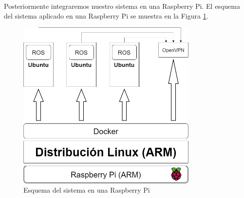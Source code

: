 Posteriormente integraremos nuestro sistema en una Raspberry Pi. El esquema del sistema aplicado en una Raspberry Pi se muestra en la Figura \ref{fig:esquemaRPi}.
\begin{figure}[H]
	\centering
	\includegraphics[width=0.8\textwidth]{figuras/esquemaRPi}
	\caption{Esquema del sistema en una Raspberry Pi}
	\label{fig:esquemaRPi}
\end{figure}

	